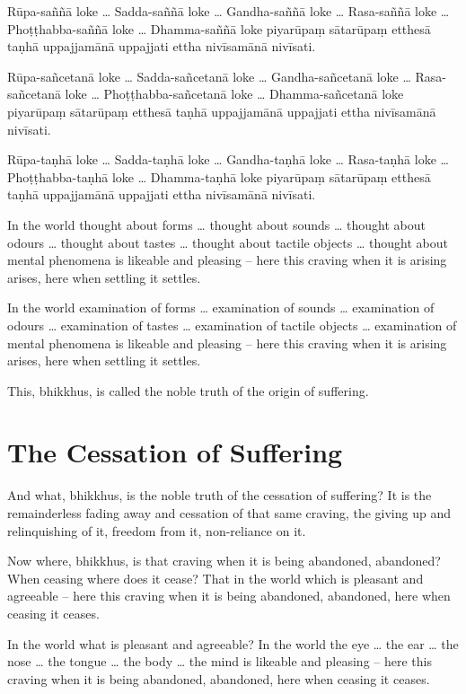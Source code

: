 Rūpa-saññā loke \ldots{} Sadda-saññā loke \ldots{} Gandha-saññā loke \ldots{}
Rasa-saññā loke \ldots{} Phoṭṭhabba-saññā loke \ldots{} Dhamma-saññā loke piyarūpaṃ
sātarūpaṃ etthesā taṇhā uppajjamānā uppajjati ettha nivīsamānā nivīsati.

Rūpa-sañcetanā loke \ldots{} Sadda-sañcetanā loke \ldots{} Gandha-sañcetanā loke
\ldots{} Rasa-sañcetanā loke \ldots{} Phoṭṭhabba-sañcetanā loke \ldots{}
Dhamma-sañcetanā loke piyarūpaṃ sātarūpaṃ etthesā taṇhā uppajjamānā uppajjati
ettha nivīsamānā nivīsati.

Rūpa-taṇhā loke \ldots{} Sadda-taṇhā loke \ldots{} Gandha-taṇhā loke \ldots{}
Rasa-taṇhā loke \ldots{} Phoṭṭhabba-taṇhā loke \ldots{} Dhamma-taṇhā loke piyarūpaṃ
sātarūpaṃ etthesā taṇhā uppajjamānā uppajjati ettha nivīsamānā nivīsati.

\englishPage

In the world thought about forms \ldots{} thought about sounds \ldots{} thought
about odours \ldots{} thought about tastes \ldots{} thought about tactile
objects \ldots{} thought about mental phenomena is likeable and pleasing -- here
this craving when it is arising arises, here when settling it settles.

In the world examination of forms \ldots{} examination of sounds \ldots{}
examination of odours \ldots{} examination of tastes \ldots{} examination of
tactile objects \ldots{} examination of mental phenomena is likeable and
pleasing -- here this craving when it is arising arises, here when settling it
settles.

This, bhikkhus, is called the noble truth of the origin of suffering.

\section{The Cessation of Suffering}

And what, bhikkhus, is the noble truth of the cessation of suffering? It is the
remainderless fading away and cessation of that same craving, the giving up and
relinquishing of it, freedom from it, non-reliance on it.

Now where, bhikkhus, is that craving when it is being abandoned, abandoned? When
ceasing where does it cease? That in the world which is pleasant and agreeable
-- here this craving when it is being abandoned, abandoned, here when ceasing it
ceases.

In the world what is pleasant and agreeable? In the world the eye \ldots{} the
ear \ldots{} the nose \ldots{} the tongue \ldots{} the body \ldots{} the mind is
likeable and pleasing -- here this craving when it is being abandoned, abandoned,
here when ceasing it ceases.

